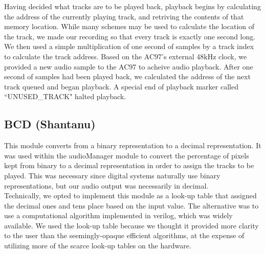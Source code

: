 \documentclass{article}
\begin{document}
Having decided what tracks are to be played back, playback begins by calculating the address of the currently playing track, and retriving the contents of that memory location. While many schemes may be used to calculate the location of the track, we made our recording so that every track is exactly one second long. We then used a simple multiplication of one second of samples by a track index to calculate the track address. Based on the AC97's external 48kHz clock, we provided a new audio sample to the AC97 to acheive audio playback. After one second of samples had been played back, we calculated the address of the next track queued and began playback. A special end of playback marker called ``UNUSED\_TRACK" halted playback. 

\subsection{BCD (Shantanu)}
This module converts from a binary representation to a decimal representation. It was used within the audioManager module to convert the percentage of pixels kept from binary to a decimal representation in order to assign the tracks to be played. This was necessary since digital systems naturally use binary representations, but our audio output was necessarily in decimal.
\\ Technically, we opted to implement this module as a look-up table that assigned the decimal ones and tens place based on the input value. The alternative was to use a computational algorithm implemented in verilog, which was widely available. We used the look-up table because we thought it provided more clarity to the user than the seemingly-opaque efficient algorithms, at the expense of utilizing more of the scarce look-up tables on the hardware. 
\end{document}
